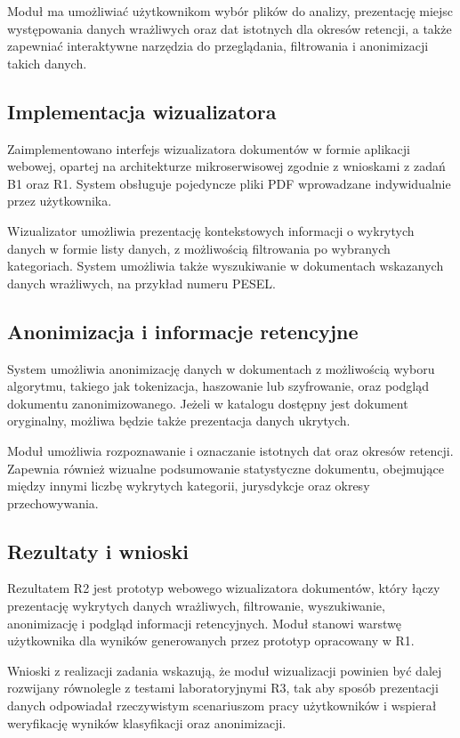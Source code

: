 \documentclass[12pt,a4paper]{report}
\begin{document}
Moduł ma umożliwiać użytkownikom wybór plików do analizy, prezentację miejsc występowania danych wrażliwych oraz dat istotnych dla okresów retencji, a także zapewniać interaktywne narzędzia do przeglądania, filtrowania i anonimizacji takich danych.

\subsection{Implementacja wizualizatora}
Zaimplementowano interfejs wizualizatora dokumentów w formie aplikacji webowej, opartej na architekturze mikroserwisowej zgodnie z wnioskami z zadań B1 oraz R1. System obsługuje pojedyncze pliki PDF wprowadzane indywidualnie przez użytkownika.

Wizualizator umożliwia prezentację kontekstowych informacji o wykrytych danych w formie listy danych, z możliwością filtrowania po wybranych kategoriach. System umożliwia także wyszukiwanie w dokumentach wskazanych danych wrażliwych, na przykład numeru PESEL.

\subsection{Anonimizacja i informacje retencyjne}
System umożliwia anonimizację danych w dokumentach z możliwością wyboru algorytmu, takiego jak tokenizacja, haszowanie lub szyfrowanie, oraz podgląd dokumentu zanonimizowanego. Jeżeli w katalogu dostępny jest dokument oryginalny, możliwa będzie także prezentacja danych ukrytych.

Moduł umożliwia rozpoznawanie i oznaczanie istotnych dat oraz okresów retencji. Zapewnia również wizualne podsumowanie statystyczne dokumentu, obejmujące między innymi liczbę wykrytych kategorii, jurysdykcje oraz okresy przechowywania.

\subsection{Rezultaty i wnioski}
Rezultatem R2 jest prototyp webowego wizualizatora dokumentów, który łączy prezentację wykrytych danych wrażliwych, filtrowanie, wyszukiwanie, anonimizację i podgląd informacji retencyjnych. Moduł stanowi warstwę użytkownika dla wyników generowanych przez prototyp opracowany w R1.

Wnioski z realizacji zadania wskazują, że moduł wizualizacji powinien być dalej rozwijany równolegle z testami laboratoryjnymi R3, tak aby sposób prezentacji danych odpowiadał rzeczywistym scenariuszom pracy użytkowników i wspierał weryfikację wyników klasyfikacji oraz anonimizacji.
\end{document}
